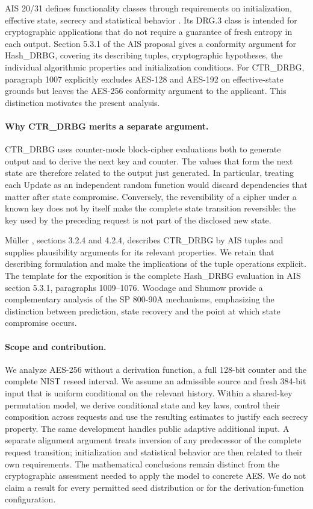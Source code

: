 \documentclass[journal=tosc,preprint,floatrow,nohyperxmp]{iacrtrans}
\numberwithin{lemma}{section}
\numberwithin{proposition}{section}
\numberwithin{equation}{section}
\theoremstyle{definition}
\numberwithin{definition}{section}
\theoremstyle{plain}
\begin{document}
AIS 20/31 defines functionality classes through requirements on initialization, effective state, secrecy and statistical behavior \cite{ais}. Its DRG.3 class is intended for cryptographic applications that do not require a guarantee of fresh entropy in each output. Section 5.3.1 of the AIS proposal gives a conformity argument for Hash\_DRBG, covering its describing tuples, cryptographic hypotheses, the individual algorithmic properties and initialization conditions. For CTR\_DRBG, paragraph 1007 explicitly excludes AES-128 and AES-192 on effective-state grounds but leaves the AES-256 conformity argument to the applicant. This distinction motivates the present analysis.

\paragraph{Why CTR\_DRBG merits a separate argument.}
CTR\_DRBG uses counter-mode block-cipher evaluations both to generate output and to derive the next key and counter. The values that form the next state are therefore related to the output just generated. In particular, treating each Update as an independent random function would discard dependencies that matter after state compromise. Conversely, the reversibility of a cipher under a known key does not by itself make the complete state transition reversible: the key used by the preceding request is not part of the disclosed new state.

Müller \cite{browser}, sections 3.2.4 and 4.2.4, describes CTR\_DRBG by AIS tuples and supplies plausibility arguments for its relevant properties. We retain that describing formulation and make the implications of the tuple operations explicit. The template for the exposition is the complete Hash\_DRBG evaluation in AIS section 5.3.1, paragraphs 1009--1076. Woodage and Shumow \cite{ws} provide a complementary analysis of the SP 800-90A mechanisms, emphasizing the distinction between prediction, state recovery and the point at which state compromise occurs.

\paragraph{Scope and contribution.}
We analyze AES-256 without a derivation function, a full 128-bit counter and the complete NIST reseed interval. We assume an admissible source and fresh 384-bit input that is uniform conditional on the relevant history. Within a shared-key permutation model, we derive conditional state and key laws, control their composition across requests and use the resulting estimates to justify each secrecy property. The same development handles public adaptive additional input. A separate alignment argument treats inversion of any predecessor of the complete request transition; initialization and statistical behavior are then related to their own requirements. The mathematical conclusions remain distinct from the cryptographic assessment needed to apply the model to concrete AES. We do not claim a result for every permitted seed distribution or for the derivation-function configuration.
\end{document}
